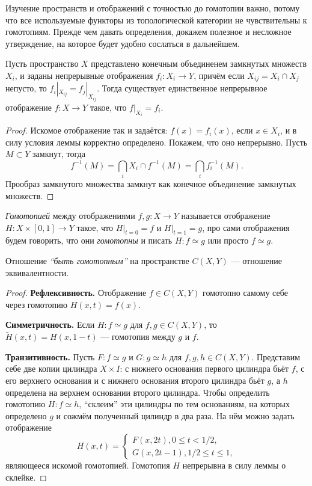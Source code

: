 Изучение пространств и отображений с точностью до гомотопии важно, потому что все используемые функторы из топологической категории не чувствительны к гомотопиям. Прежде чем давать определения, докажем полезное и несложное утверждение, на которое будет удобно сослаться в дальнейшем.
\begin{lem}[о склейке]
	Пусть пространство $X$ представлено конечным объединенем замкнутых множеств $X_i$, и заданы непрерывные отображения $f_i\colon X_i\to Y$, причём если $X_{ij}=X_i\cap X_j$ непусто, то $f_i|_{X_{ij}}=f_j|_{X_{ij}}$. Тогда существует единственное непрерывное отображение $f\colon X\to Y$ такое, что $f|_{X_i}=f_i$.
\end{lem}
\begin{proof}
	Искомое отображение так и задаётся: $f(x)=f_i(x)$, если $x\in X_i$, и в силу условия леммы корректно определено. Покажем, что оно непрерывно. Пусть $M\subset Y$ замкнут, тогда
		\begin{equation*}
			f^{-1}(M)=\bigcap_i X_i\cap f^{-1}(M)=\bigcap_i f_i^{-1}(M).
		\end{equation*}
	Прообраз замкнутого множества замкнут как конечное объединение замкнутых множеств.
\end{proof}
\begin{defin}
	\textit{Гомотопией} между отображениями $f,g\colon X\to Y$ называется отображение $H\colon X\times[0,1]\to Y$ такое, что $H|_{t=0}=f$ и $H|_{t=1}=g$, про сами отображения будем говорить, что они \textit{гомотопны} и писать $H\colon f\simeq g$ или просто $f\simeq g$.
\end{defin}
\begin{prop}
	Отношение \textit{``быть гомотопным''} на пространстве $C(X,Y)$ --- отношение эквивалентности.
\end{prop}
\begin{proof}
	\textbf{Рефлексивность.} Отображение $f\in C(X,Y)$ гомотопно самому себе через гомотопию $H(x,t)=f(x)$.

	\textbf{Симметричность.} Если $H\colon f\simeq g$ для $f,g\in C(X,Y)$, то $\tilde{H}(x,t)=H(x,1-t)$ --- гомотопия между $g$ и $f$.

	\textbf{Транзитивность.} Пусть $F\colon f\simeq g$ и $G\colon g\simeq h$ для $f,g,h\in C(X,Y)$. Представим себе две копии цилиндра $X\times I$: с нижнего основания первого цилиндра бьёт $f$, с его верхнего основания и с нижнего основания второго цилиндра бьёт $g$, а $h$ определена на верхнем основании второго цилиндра. Чтобы определить гомотопию $H\colon f\simeq h$, ``склеим'' эти цилиндры по тем основаниям, на которых определено $g$ и сожмём полученный цилиндр в два раза. На нём можно задать отображение
		\begin{equation*}
			H(x,t)=\begin{cases}
				F(x,2t), 0\leqslant t<1/2,\\
				G(x,2t-1), 1/2\leqslant t\leqslant 1,
			\end{cases}
		\end{equation*}
	являющееся искомой гомотопией. Гомотопия $H$ непрерывна в силу леммы о склейке.
\end{proof}

